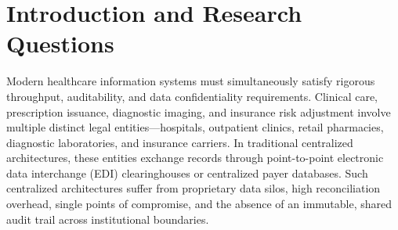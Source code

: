 \documentclass[runningheads]{llncs}
\begin{document}
\begin{abstract}
across 60 scenarios while disclaiming commercial underwriting certification.

\end{abstract}

\section{Introduction and Research Questions}
Modern healthcare information systems must simultaneously satisfy rigorous throughput, auditability, and data confidentiality requirements. Clinical care, prescription issuance, diagnostic imaging, and insurance risk adjustment involve multiple distinct legal entities---hospitals, outpatient clinics, retail pharmacies, diagnostic laboratories, and insurance carriers. In traditional centralized architectures, these entities exchange records through point-to-point electronic data interchange (EDI) clearinghouses or centralized payer databases. Such centralized architectures suffer from proprietary data silos, high reconciliation overhead, single points of compromise, and the absence of an immutable, shared audit trail across institutional boundaries.
\end{document}
